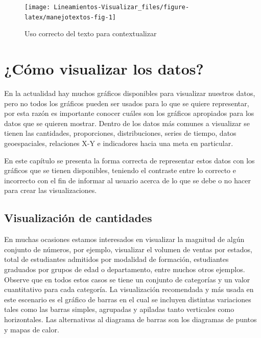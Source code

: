 \documentclass[
]{book}
\begin{document}
\begin{figure}

{\centering \texttt{[image: Lineamientos-Visualizar\_files/figure-latex/manejotextos-fig-1]} 

}

\caption{Uso correcto del texto para contextualizar}\label{fig:manejotextos-fig}
\end{figure}

\hypertarget{cuxf3mo-visualizar-los-datos}{%
\chapter{¿Cómo visualizar los datos?}\label{cuxf3mo-visualizar-los-datos}}

En la actualidad hay muchos gráficos disponibles para visualizar nuestros datos, pero no todos los gráficos pueden ser usados para lo que se quiere representar, por esta razón es importante conocer cuáles son los gráficos apropiados para los datos que se quieren mostrar. Dentro de los datos más comunes a visualizar se tienen las cantidades, proporciones, distribuciones, series de tiempo, datos geoespaciales, relaciones X-Y e indicadores hacia una meta en particular.

En este capítulo se presenta la forma correcta de representar estos datos con los gráficos que se tienen disponibles, teniendo el contraste entre lo correcto e incorrecto con el fin de informar al usuario acerca de lo que se debe o no hacer para crear las visualizaciones.

\hypertarget{visualizaciuxf3n-de-cantidades}{%
\section{Visualización de cantidades}\label{visualizaciuxf3n-de-cantidades}}

En muchas ocasiones estamos interesados en visualizar la magnitud de algún conjunto de números, por ejemplo, visualizar el volumen de ventas por estados, total de estudiantes admitidos por modalidad de formación, estudiantes graduados por grupos de edad o departamento, entre muchos otros ejemplos. Observe que en todos estos casos se tiene un conjunto de categorías y un valor cuantitativo para cada categoría. La visualización recomendada y más usada en este escenario es el gráfico de barras en el cual se incluyen distintas variaciones tales como las barras simples, agrupadas y apiladas tanto verticales como horizontales. Las alternativas al diagrama de barras son los diagramas de puntos y mapas de calor.
\end{document}
